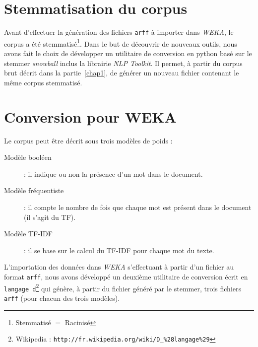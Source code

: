 \section{Stemmatisation du corpus}
Avant d'effectuer la génération des fichiers \texttt{arff} à importer dans \textit{WEKA}, le corpus a été stemmatisé\footnote{Stemmatisé $=$ Racinisé}. Dans le but de découvrir de nouveaux outils, nous avons fait le choix de développer un utilitaire de conversion en python basé sur le stemmer \textit{snowball} inclus la librairie \textit{NLP Toolkit}. Il permet, à partir du corpus brut décrit dans la partie~\vref{chap1}, de générer un nouveau fichier contenant le même corpus stemmatisé.

\section{Conversion pour WEKA}
Le corpus peut être décrit sous trois modèles de poids :

\begin{description}
\item[Modèle booléen] : il indique ou non la présence d'un mot dans le document.
\item[Modèle fréquentiste] : il compte le nombre de fois que chaque mot est présent dans le document (il s'agit du TF).
\item[Modèle TF-IDF] : il se base sur le calcul du TF-IDF pour chaque mot du texte.
\end{description}

L'importation des données dans \textit{WEKA} s'effectuant à partir d'un fichier au format \texttt{arff}, nous avons développé un deuxième utilitaire de conversion écrit en \texttt{langage d}\footnote{Wikipedia : \texttt{http://fr.wikipedia.org/wiki/D\_\%28langage\%29}} qui génère, à partir du fichier généré par le stemmer, trois fichiers \texttt{arff} (pour chacun des trois modèles).
